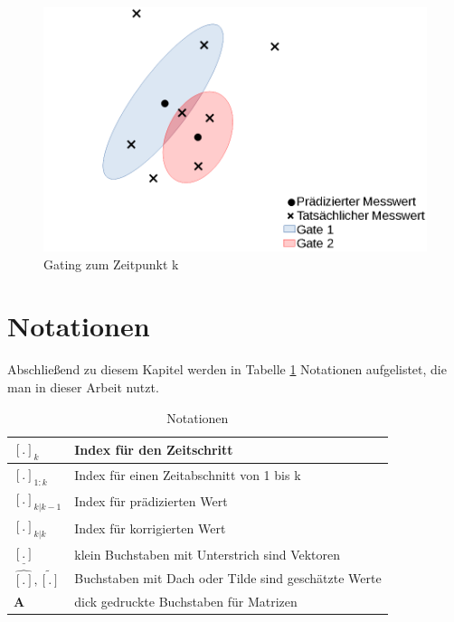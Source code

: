 \documentclass[10pt,a4paper]{article}
\begin{document}
	\begin{figure}[h]
		\centering
		\includegraphics[width=0.50\linewidth]{./Pictures_report/Gating.png}
		\caption{Gating zum Zeitpunkt k}
		\label{fig: Gating}
	\end{figure}
\section{Notationen}
	Abschließend zu diesem Kapitel werden in Tabelle \ref{tab: Notationen} Notationen aufgelistet, die man in dieser Arbeit nutzt.
	\begin{table}[h]
		\centering
		\begin{tabular}{|l|l|}
			\hline
			$[.]_k$					&Index für den Zeitschritt\\ \hline
			$[.]_{1:k}$				&Index für einen Zeitabschnitt von 1 bis k\\ \hline
			$[.]_{k|k-1}$			&Index für prädizierten Wert\\ \hline
			$[.]_{k|k}$				&Index für korrigierten Wert\\ \hline
			$\underline{[.]}$		&klein Buchstaben mit Unterstrich sind Vektoren\\ \hline
			$\hat{[.]},\tilde{[.]}$	&Buchstaben mit Dach oder Tilde sind geschätzte Werte\\ \hline
			$\textbf{A}$			&dick gedruckte Buchstaben für Matrizen\\ \hline
			
	\end{tabular}
		\caption{Notationen}
		\label{tab: Notationen}
	\end{table}
\end{document}
